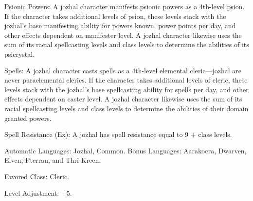 \begin{itemize*}
    \item Psionic Powers: A jozhal character manifests psionic powers as a 4th-level psion. If the character takes additional levels of psion, these levels stack with the jozhal's base manifesting ability for powers known, power points per day, and other effects dependent on manifester level. A jozhal character likewise uses the sum of its racial spellcasting levels and class levels to determine the abilities of its psicrystal.
    \item Spells: A jozhal character casts spells as a 4th-level elemental cleric---jozhal are never paraelemental clerics. If the character takes additional levels of cleric, these levels stack with the jozhal's base spellcasting ability for spells per day, and other effects dependent on caster level. A jozhal character likewise uses the sum of its racial spellcasting levels and class levels to determine the abilities of their domain granted powers.
    \item Spell Resistance (Ex): A jozhal has spell resistance equal to 9 + class levels.
    \item Automatic Languages: Jozhal, Common. Bonus Languages: Aarakocra, Dwarven, Elven, Pterran, and Thri-Kreen.
    \item Favored Class: Cleric.
    \item Level Adjustment: +5.
\end{itemize*}
